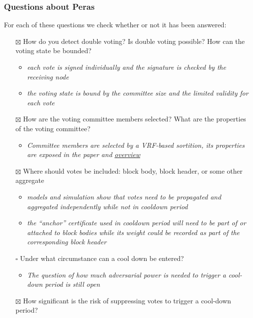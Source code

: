 \documentclass[10pt]{article}
\providecommand{\tightlist}{%
  \setlength{\itemsep}{0pt}\setlength{\parskip}{0pt}}
\begin{document}
\subsubsection{Questions about Peras}\label{questions-about-peras}

For each of these questions we check whether or not it has been
answered:

\begin{itemize}
\tightlist
\item[$\boxtimes$]
  How do you detect double voting? Is double voting possible? How can
  the voting state be bounded?

  \begin{itemize}
  \tightlist
  \item
    \emph{each vote is signed individually and the signature is checked
    by the receiving node}
  \item
    \emph{the voting state is bound by the committee size and the
    limited validity for each vote}
  \end{itemize}
\item[$\boxtimes$]
  How are the voting committee members selected? What are the properties
  of the voting committee?

  \begin{itemize}
  \tightlist
  \item
    \emph{Committee members are selected by a VRF-based sortition, its
    properties are exposed in the paper and
    \hyperref[overview]{overview}}
  \end{itemize}
\item[$\boxtimes$]
  Where should votes be included: block body, block header, or some
  other aggregate

  \begin{itemize}
  \tightlist
  \item
    \emph{models and simulation show that votes need to be propagated
    and aggregated independently while not in cooldown period}
  \item
    \emph{the ``anchor'' certificate used in cooldown period will need
    to be part of or attached to block bodies while its weight could be
    recorded as part of the corresponding block header}
  \end{itemize}
\item[$\square$]
  Under what circumstance can a cool down be entered?

  \begin{itemize}
  \tightlist
  \item
    \emph{The question of how much adversarial power is needed to
    trigger a cool-down period is still open}
  \end{itemize}
\item[$\boxtimes$]
  How significant is the risk of suppressing votes to trigger a
  cool-down period?


\end{itemize}
\end{document}
